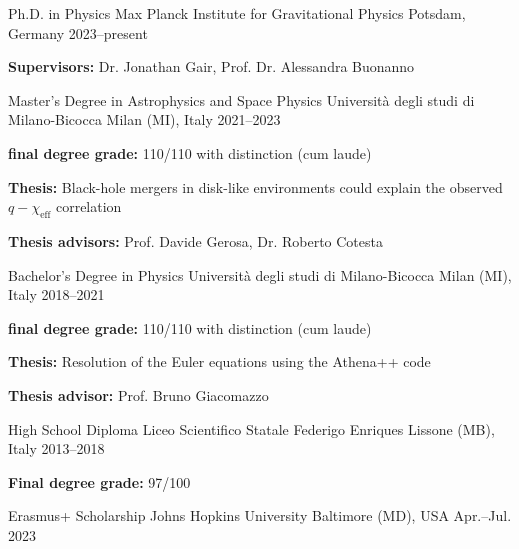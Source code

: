 


\begin{cventries}
\cventry
{Ph.D. in Physics} %
{Max Planck Institute for Gravitational Physics} %
{Potsdam, Germany} %
{2023--present} %
{ %
\begin{cvitems}
	\item {\textbf{Supervisors:} Dr. Jonathan Gair, Prof. Dr. Alessandra Buonanno}
\end{cvitems}
}
\cventry
{Master's Degree in Astrophysics and Space Physics} %
{Università degli studi di Milano-Bicocca} %
{Milan (MI), Italy} %
{2021--2023} %
{ %
\begin{cvitems}
	\item {\textbf{final degree grade:} 110/110 with distinction (cum laude)}
	\item {\textbf{Thesis:} Black-hole mergers in disk-like environments could explain  the observed $q-\chi_\mathrm{eff}$ correlation}
	\item {\textbf{Thesis advisors:} Prof. Davide Gerosa, Dr. Roberto Cotesta}
\end{cvitems}
}

\cventry
{Bachelor's Degree in Physics} %
{Università degli studi di Milano-Bicocca} %
{Milan (MI), Italy} %
{2018--2021} %
{ %
\begin{cvitems}
	\item {\textbf{final degree grade:} 110/110 with distinction (cum laude)}
	\item {\textbf{Thesis:} Resolution of the Euler equations using the Athena++ code}
	\item {\textbf{Thesis advisor:} Prof. Bruno Giacomazzo}
\end{cvitems}
}

\cventry
{High School Diploma} %
{Liceo Scientifico Statale Federigo Enriques} %
{Lissone (MB), Italy} %
{2013--2018} %
{ %
\begin{cvitems}
	\item {\textbf{Final degree grade:} 97/100}
\end{cvitems}
}
\end{cventries}


\begin{cventries}

\cventry
{Erasmus+ Scholarship} %
{Johns Hopkins University} %
{Baltimore (MD), USA} %
{Apr.--Jul. 2023} %
{}

\end{cventries}